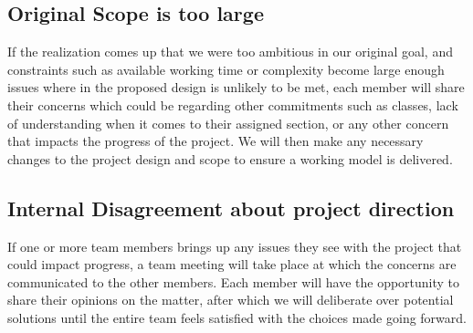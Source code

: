\documentclass{article} %
\begin{document}
\subsection{Original Scope is too large}

If the realization comes up that we were too ambitious in our original goal, and constraints such as available working time or complexity become large enough issues where in the proposed design is unlikely to be met, each member will share their concerns which could be regarding other commitments such as classes, lack of understanding when it comes to their assigned section, or any other concern that impacts the progress of the project. We will then make any necessary changes to the project design and scope to ensure a working model is delivered.

\subsection{Internal Disagreement about project direction}

If one or more team members brings up any issues they see with the project that could impact progress, a team meeting will take place at which the concerns are communicated to the other members. Each member will have the opportunity to share their opinions on the matter, after which we will deliberate over potential solutions until the entire team feels satisfied with the choices made going forward.





\pagebreak
\label{last_page}



\end{document}
